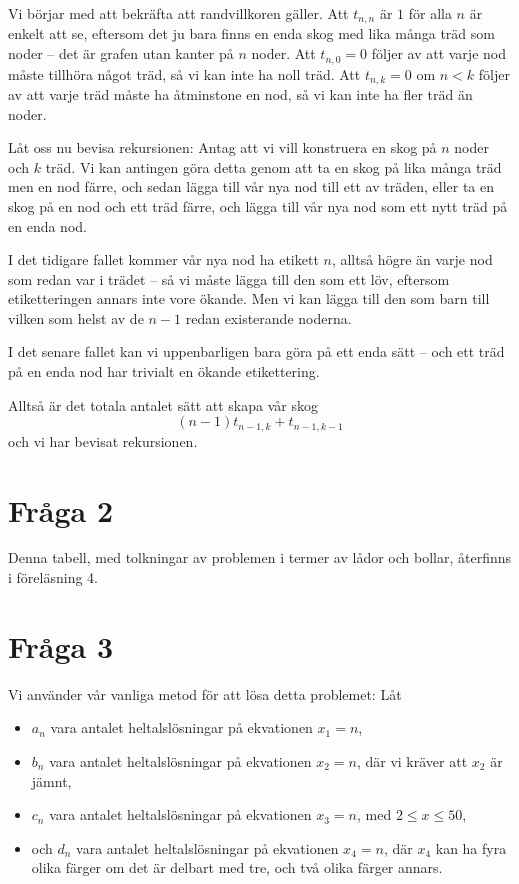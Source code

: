 \documentclass[nobib]{tufte-handout}
\begin{document}
Vi börjar med att bekräfta att randvillkoren gäller. Att $t_{n,n}$ är $1$ för alla $n$ är enkelt att se, eftersom det ju bara finns en enda skog med lika många träd som noder -- det är grafen utan kanter på $n$ noder. Att $t_{n,0} = 0$ följer av att varje nod måste tillhöra något träd, så vi kan inte ha noll träd. Att $t_{n,k} = 0$ om $n < k$ följer av att varje träd måste ha åtminstone en nod, så vi kan inte ha fler träd än noder.

Låt oss nu bevisa rekursionen: Antag att vi vill konstruera en skog på $n$ noder och $k$ träd. Vi kan antingen göra detta genom att ta en skog på lika många träd men en nod färre, och sedan lägga till vår nya nod till ett av träden, eller ta en skog på en nod och ett träd färre, och lägga till vår nya nod som ett nytt träd på en enda nod.

I det tidigare fallet kommer vår nya nod ha etikett $n$, alltså högre än varje nod som redan var i trädet -- så vi måste lägga till den som ett löv, eftersom etiketteringen annars inte vore ökande. Men vi kan lägga till den som barn till vilken som helst av de $n-1$ redan existerande noderna.

I det senare fallet kan vi uppenbarligen bara göra på ett enda sätt -- och ett träd på en enda nod har trivialt en ökande etikettering.

Alltså är det totala antalet sätt att skapa vår skog
$$(n-1)t_{n-1,k} + t_{n-1,k-1}$$
och vi har bevisat rekursionen.

\section{Fråga 2}

Denna tabell, med tolkningar av problemen i termer av lådor och bollar, återfinns i föreläsning 4.

\section{Fråga 3}

Vi använder vår vanliga metod för att lösa detta problemet: Låt 
\begin{itemize}
  \item $a_n$ vara antalet heltalslösningar på ekvationen $x_1 = n$,
  \item $b_n$ vara antalet heltalslösningar på ekvationen $x_2 = n$, där vi kräver att $x_2$ är jämnt,
  \item $c_n$ vara antalet heltalslösningar på ekvationen $x_3 = n$, med $2 \leq x \leq 50$,
  \item och $d_n$ vara antalet heltalslösningar på ekvationen $x_4 = n$, där $x_4$ kan ha fyra olika färger om det är delbart med tre, och två olika färger annars.
\end{itemize}
\end{document}
